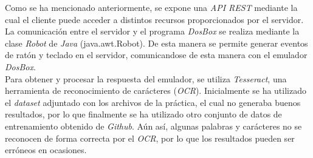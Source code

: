 \documentclass[10pt,a4paper]{article}
\begin{document}
Como se ha mencionado anteriormente, se expone una \textit{API REST} mediante la cual el cliente puede acceder a distintos recursos proporcionados por el servidor.\\
La comunicación entre el servidor y el programa \textit{DosBox} se realiza mediante la clase \textit{Robot} de \textit{Java} (java.awt.Robot). De esta manera se permite generar eventos de ratón y teclado en el servidor, comunicandose de esta manera con el emulador \textit{DosBox}. \\
Para obtener y procesar la respuesta del emulador, se utiliza \textit{Tesseract}, una herramienta de reconocimiento de carácteres (\textit{OCR}). Inicialmente se ha utilizado el \textit{dataset} adjuntado con los archivos de la práctica, el cual no generaba buenos resultados, por lo que finalmente se ha utilizado otro conjunto de datos de entrenamiento obtenido de \textit{Github}. Aún así, algunas palabras y carácteres no se reconocen de forma correcta por el \textit{OCR}, por lo que los resultados pueden ser erróneos en ocasiones. \\
\end{document}
